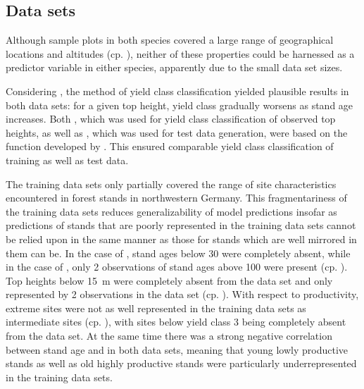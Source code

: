 \subsection{Data sets}

Although sample plots in both species covered a large range of geographical locations and altitudes (cp. ), neither of these properties could be harnessed as a predictor variable in either species, apparently due to the small data set sizes.

Considering , the method of yield class classification yielded plausible results in both data sets:  for a given top height, yield class gradually worsens as stand age increases.  Both , which was used for yield class classification of observed top heights, as well as , which was used for test data generation, were based on the function developed by \textcite{Nagel1999}.  This ensured comparable yield class classification of training as well as test data.

The training data sets only partially covered the range of site characteristics encountered in forest stands in northwestern Germany.
This fragmentariness of the training data sets reduces generalizability of model predictions insofar as predictions of stands that are poorly represented in the training data sets cannot be relied upon in the same manner as those for stands which are well mirrored in them can be.
In the case of \Beech{}, stand ages below \SI{30}{\year} were completely absent, while in the case of \Spruce{}, only \num{2} observations of stand ages above \SI{100}{\year} were present (cp. ).
Top heights below \SI{15}{\meter} were completely absent from the \Beech{} data set and only represented by \num{2} observations in the \Spruce{} data set (cp. ).
With respect to productivity, extreme sites were not as well represented in the training data sets as intermediate sites (cp. ), with sites below yield class \num{3} being completely absent from the \Beech{} data set.  At the same time there was a strong negative correlation between stand age and \ProductivityIndexText{} in both data sets, meaning that young lowly productive stands as well as old highly productive stands were particularly underrepresented in the training data sets.

